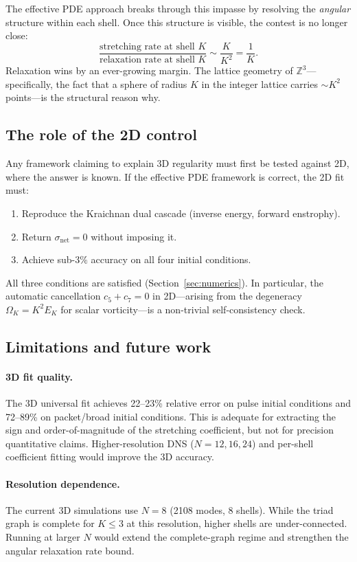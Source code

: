 \documentclass[11pt,a4paper]{article}
\theoremstyle{remark}
\newcommand{\Z}{\mathbb{Z}}
\begin{document}
The effective PDE approach breaks through this impasse by resolving the \emph{angular} structure within each shell.  Once this structure is visible, the contest is no longer close:
\[
  \frac{\text{stretching rate at shell } K}{\text{relaxation rate at shell } K} \sim \frac{K}{K^2} = \frac{1}{K}.
\]
Relaxation wins by an ever-growing margin.  The lattice geometry of $\Z^3$---specifically, the fact that a sphere of radius $K$ in the integer lattice carries $\sim K^2$ points---is the structural reason why.

\subsection{The role of the 2D control}

Any framework claiming to explain 3D regularity must first be tested against 2D, where the answer is known.  If the effective PDE framework is correct, the 2D fit must:
\begin{enumerate}
\item Reproduce the Kraichnan dual cascade (inverse energy, forward enstrophy).
\item Return $\sigma_{\mathrm{net}} = 0$ without imposing it.
\item Achieve sub-$3\%$ accuracy on all four initial conditions.
\end{enumerate}
All three conditions are satisfied (Section~\ref{sec:numerics}).  In particular, the automatic cancellation $c_5 + c_7 = 0$ in 2D---arising from the degeneracy $\Omega_K = K^2 E_K$ for scalar vorticity---is a non-trivial self-consistency check.

\subsection{Limitations and future work}

\paragraph{3D fit quality.}  The 3D universal fit achieves 22--23\% relative error on pulse initial conditions and 72--89\% on packet/broad initial conditions.  This is adequate for extracting the sign and order-of-magnitude of the stretching coefficient, but not for precision quantitative claims.  Higher-resolution DNS ($N = 12, 16, 24$) and per-shell coefficient fitting would improve the 3D accuracy.

\paragraph{Resolution dependence.}  The current 3D simulations use $N = 8$ (2108 modes, 8 shells).  While the triad graph is complete for $K \leq 3$ at this resolution, higher shells are under-connected.  Running at larger $N$ would extend the complete-graph regime and strengthen the angular relaxation rate bound.
\end{document}
